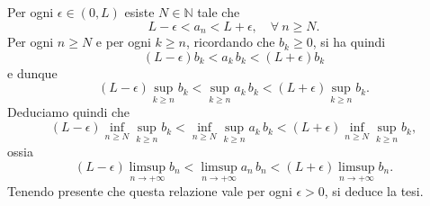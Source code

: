 \begin{demonstration}
\begin{enumerate}
	Per ogni $\epsilon \in (0,L)$ esiste $N\in \mathbb{N}$ tale che
	\begin{equation*}
		L-\epsilon < a_n < L+\epsilon,\quad \forall \ n\geq N.
	\end{equation*}
	Per ogni $n\geq N$ e per ogni $k\geq n$, ricordando che $b_k\geq 0$, si ha quindi
	\begin{equation*}
		(L-\epsilon) b_k < a_k\, b_k < (L+\epsilon ) b_k
	\end{equation*}
	e dunque
	\begin{equation*}
		(L-\epsilon) \sup_{k\geq n} b_k < \sup_{k\geq n} a_k\, b_k < (L+\epsilon ) \sup_{k\geq n} b_k.
	\end{equation*}
	Deduciamo quindi che
	\begin{equation*}
		(L-\epsilon) \inf_{n\geq N} \sup_{k\geq n} b_k < \inf_{n\geq N} \sup_{k\geq n} a_k\, b_k < (L+\epsilon )  \inf_{n\geq N} \sup_{k\geq n} b_k,
	\end{equation*}
	ossia
	\begin{equation*}
		(L-\epsilon) \limsup_{n\to +\infty} b_n < \limsup_{n\to +\infty} a_n\, b_n < (L+\epsilon ) \limsup_{n\to +\infty} b_n.
	\end{equation*}
	Tenendo presente che questa relazione vale per ogni $\epsilon >0$, si deduce la tesi.\qedhere
\end{enumerate}
\end{demonstration}